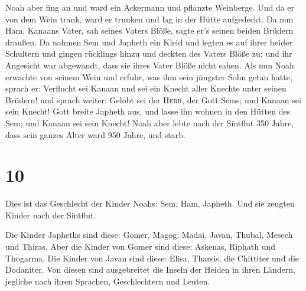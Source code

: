  Noah aber fing an und ward ein Ackermann und pflanzte
Weinberge.  Und da er von dem Wein trank, ward er trunken
und lag in der Hütte aufgedeckt.  Da nun Ham, Kanaans
Vater, sah seines Vaters Blöße, sagte er's seinen beiden Brüdern
draußen.  Da nahmen Sem und Japheth ein Kleid und legten
es auf ihrer beider Schultern und gingen rücklings hinzu und deckten des
Vaters Blöße zu; und ihr Angesicht war abgewandt, dass sie ihres Vater
Blöße nicht sahen.  Als nun Noah erwachte von seinem Wein
und erfuhr, was ihm sein jüngster Sohn getan hatte, 
sprach er: Verflucht sei Kanaan und sei ein Knecht aller Knechte unter
seinen Brüdern!  und sprach weiter: Gelobt sei der
\textsc{Herr}, der Gott Sems; und Kanaan sei sein Knecht!
 Gott breite Japheth aus, und lasse ihn wohnen in den
Hütten des Sem; und Kanaan sei sein Knecht!  Noah aber
lebte nach der Sintflut 350 Jahre,  dass sein ganzes
Alter ward 950 Jahre, und starb.

\hypertarget{section-9}{%
\section{10}\label{section-9}}

 Dies ist das Geschlecht der Kinder Noahs: Sem, Ham,
Japheth. Und sie zeugten Kinder nach der Sintflut.

 Die Kinder Japheths sind diese: Gomer, Magog, Madai,
Javan, Thubal, Mesech und Thiras.  Aber die Kinder von
Gomer sind diese: Askenas, Riphath und Thogarma.  Die
Kinder von Javan sind diese: Elisa, Tharsis, die Chittiter und die
Dodaniter.  Von diesen sind ausgebreitet die Inseln der
Heiden in ihren Ländern, jegliche nach ihren Sprachen, Geschlechtern und
Leuten.

